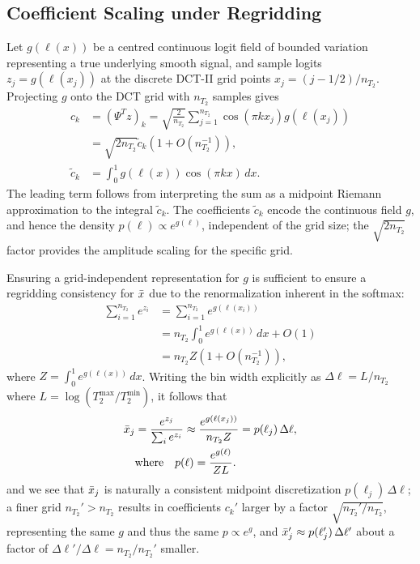 \subsection{Coefficient Scaling under Regridding}

Let $g(\ell(x))$ be a centred continuous logit field of bounded variation representing a true underlying smooth signal, and sample logits $z_j = g(\ell(x_j))$ at the discrete \gls*{DCT}-II grid points $x_j = (j - 1/2) / n_{T_2}$.
Projecting $g$ onto the \gls*{DCT} grid with $n_{T_2}$ samples gives
\begin{align}\label{eqn:apx:cross_res_dct_scaling}
    c_k         & = (\Psi^T z)_k = \sqrt{\frac{2}{n_{T_2}}} \sum_{j = 1}^{n_{T_2}} \cos(\pi k x_j) g(\ell(x_j)) \nonumber \\
                & = \sqrt{2 n_{T_2}} \tilde{c}_k \left(1 + O(n_{T_2}^{-1})\right),                                        \\
    \tilde{c}_k & = \int_0^1 g(\ell(x)) \cos(\pi k x) \, dx. \nonumber
\end{align}
The leading term follows from interpreting the sum as a midpoint Riemann approximation to the integral $\tilde{c}_k$.
The coefficients $\tilde{c}_k$ encode the continuous field $g$, and hence the density $p(\ell) \propto e^{g(\ell)}$, independent of the grid size; the $\sqrt{2 n_{T_2}}$ factor provides the amplitude scaling for the specific grid.

Ensuring a grid-independent representation for $g$ is sufficient to ensure a regridding consistency for $\bar{x}$ due to the renormalization inherent in the softmax:
\begin{align}
    \sum_{i = 1}^{n_{T_2}} e^{z_i} & = \sum_{i = 1}^{n_{T_2}} e^{g(\ell(x_i))}                \\
                                   & = n_{T_2} \int_0^1 e^{g(\ell(x))} \, dx + O(1) \nonumber \\
                                   & = n_{T_2} Z \left(1 + O(n_{T_2}^{-1})\right), \nonumber
\end{align}
where $Z = \int_0^1 e^{g(\ell(x))} \, dx$.
Writing the bin width explicitly as $\Delta\ell = L / n_{T_2}$ where $L = \log(T_2^{\max} / T_2^{\min})$, it follows that
\begin{align}\label{eqn:apx:xdist_consistent_discretization}
    \bar{x}_j & = \frac{e^{z_j}}{\sum_i e^{z_i}} \approx \frac{e^{g(\ell(x_j))}}{n_{T_2} Z} = p(\ell_j) \, \Delta\ell, \\
                    & \text{where} \quad p(\ell) = \frac{e^{g(\ell)}}{Z L}. \nonumber
\end{align}
and we see that $\bar{x}_j$ is naturally a consistent midpoint discretization $p(\ell_j) \, \Delta\ell$;
a finer grid $n_{T_2}' > n_{T_2}$ results in coefficients $c_k'$ larger by a factor $\sqrt{n_{T_2}' / n_{T_2}}$, representing the same $g$ and thus the same $p \propto e^g$, and $\bar{x}'_j \approx p(\ell'_j) \, \Delta\ell'$ about a factor of $\Delta\ell' / \Delta\ell = n_{T_2} / n_{T_2}'$ smaller.

